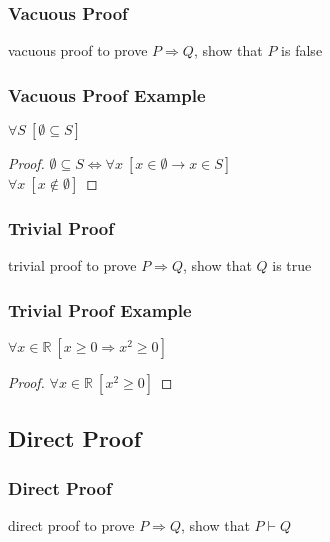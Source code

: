 \documentclass[dvipsnames]{beamer}
\begin{document}
\begin{frame}
  \frametitle{Vacuous Proof}

  \begin{block}{vacuous proof}
    to prove $P \Rightarrow Q$, show that $P$ is false
  \end{block}
\end{frame}

\begin{frame}
  \frametitle{Vacuous Proof Example}

  \begin{theorem}
    $\forall S~[\emptyset \subseteq S]$
  \end{theorem}

  \pause
  \begin{proof}
    $\emptyset \subseteq S \Leftrightarrow
      \forall x~[x \in \emptyset \rightarrow x \in S]$\\\pause
    $\forall x~[x \notin \emptyset]$
  \end{proof}
\end{frame}

\begin{frame}
  \frametitle{Trivial Proof}

  \begin{block}{trivial proof}
    to prove $P \Rightarrow Q$, show that $Q$ is true
  \end{block}
\end{frame}

\begin{frame}
  \frametitle{Trivial Proof Example}

  \begin{theorem}
    $\forall x \in \mathbb{R}~[x \geq 0 \Rightarrow x^2 \geq 0]$
  \end{theorem}

  \pause
  \begin{proof}
    $\forall x \in \mathbb{R}~[x^2 \geq 0]$
  \end{proof}
\end{frame}

\subsection{Direct Proof}

\begin{frame}
  \frametitle{Direct Proof}

  \begin{block}{direct proof}
    to prove $P \Rightarrow Q$, show that $P \vdash Q$
  \end{block}
\end{frame}
\end{document}
